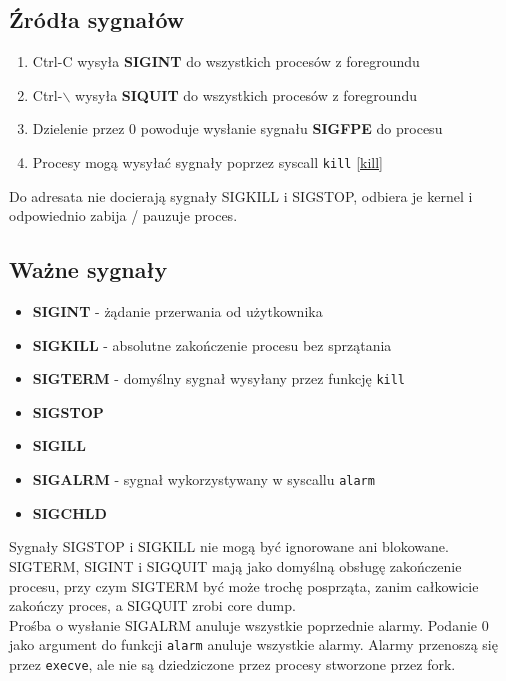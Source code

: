 \subsection{Źródła sygnałów}
\begin{enumerate}
	\item Ctrl-C wysyła \textbf{SIGINT} do wszystkich procesów z foregroundu
	\item Ctrl-\(\backslash\) wysyła \textbf{SIQUIT} do wszystkich procesów z foregroundu
	\item Dzielenie przez 0 powoduje wysłanie sygnału \textbf{SIGFPE} do procesu
	\item Procesy mogą wysyłać sygnały poprzez syscall \texttt{kill} \ref{kill}
\end{enumerate}
Do adresata nie docierają sygnały SIGKILL i SIGSTOP, odbiera je kernel i odpowiednio zabija / pauzuje proces.
\subsection{Ważne sygnały}
\begin{itemize}
	\item \textbf{SIGINT} - żądanie przerwania od użytkownika
	\item \textbf{SIGKILL} - absolutne zakończenie procesu bez sprzątania
	\item \textbf{SIGTERM} - domyślny sygnał wysyłany przez funkcję \texttt{kill}
	\item \textbf{SIGSTOP}
	\item \textbf{SIGILL}
	\item \textbf{SIGALRM} - sygnał wykorzystywany w syscallu \texttt{alarm}
	\item \textbf{SIGCHLD}
\end{itemize}
Sygnały SIGSTOP i SIGKILL nie mogą być ignorowane ani blokowane.
SIGTERM, SIGINT i SIGQUIT mają jako domyślną obsługę zakończenie procesu, przy czym SIGTERM być może trochę posprząta, zanim całkowicie zakończy proces, a SIGQUIT zrobi core dump. \\
Prośba o wysłanie SIGALRM anuluje wszystkie poprzednie alarmy. Podanie 0 jako argument do funkcji \texttt{alarm} anuluje wszystkie alarmy. Alarmy przenoszą się przez \texttt{execve}, ale nie są dziedziczone przez procesy stworzone przez fork.

